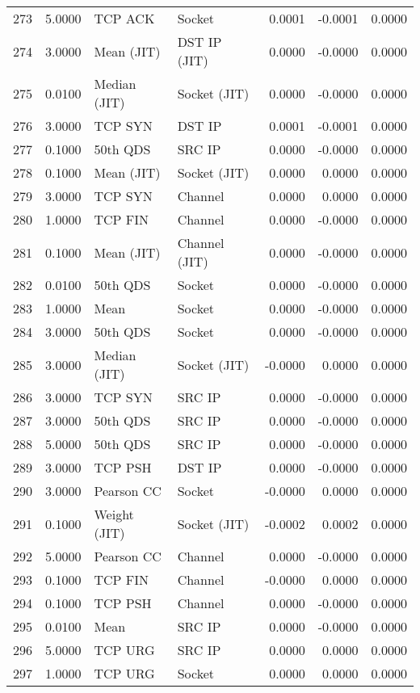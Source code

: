 \begin{longtable}{lrllrrr}
273 & 5.0000 & TCP ACK & Socket & 0.0001 & -0.0001 & 0.0000 \\
274 & 3.0000 & Mean (JIT) & DST IP (JIT) & 0.0000 & -0.0000 & 0.0000 \\
275 & 0.0100 & Median (JIT) & Socket (JIT) & 0.0000 & -0.0000 & 0.0000 \\
276 & 3.0000 & TCP SYN & DST IP & 0.0001 & -0.0001 & 0.0000 \\
277 & 0.1000 & 50th QDS & SRC IP & 0.0000 & -0.0000 & 0.0000 \\
278 & 0.1000 & Mean (JIT) & Socket (JIT) & 0.0000 & 0.0000 & 0.0000 \\
279 & 3.0000 & TCP SYN & Channel & 0.0000 & 0.0000 & 0.0000 \\
280 & 1.0000 & TCP FIN & Channel & 0.0000 & -0.0000 & 0.0000 \\
281 & 0.1000 & Mean (JIT) & Channel (JIT) & 0.0000 & -0.0000 & 0.0000 \\
282 & 0.0100 & 50th QDS & Socket & 0.0000 & -0.0000 & 0.0000 \\
283 & 1.0000 & Mean & Socket & 0.0000 & -0.0000 & 0.0000 \\
284 & 3.0000 & 50th QDS & Socket & 0.0000 & -0.0000 & 0.0000 \\
285 & 3.0000 & Median (JIT) & Socket (JIT) & -0.0000 & 0.0000 & 0.0000 \\
286 & 3.0000 & TCP SYN & SRC IP & 0.0000 & -0.0000 & 0.0000 \\
287 & 3.0000 & 50th QDS & SRC IP & 0.0000 & -0.0000 & 0.0000 \\
288 & 5.0000 & 50th QDS & SRC IP & 0.0000 & -0.0000 & 0.0000 \\
289 & 3.0000 & TCP PSH & DST IP & 0.0000 & -0.0000 & 0.0000 \\
290 & 3.0000 & Pearson CC & Socket & -0.0000 & 0.0000 & 0.0000 \\
291 & 0.1000 & Weight (JIT) & Socket (JIT) & -0.0002 & 0.0002 & 0.0000 \\
292 & 5.0000 & Pearson CC & Channel & 0.0000 & -0.0000 & 0.0000 \\
293 & 0.1000 & TCP FIN & Channel & -0.0000 & 0.0000 & 0.0000 \\
294 & 0.1000 & TCP PSH & Channel & 0.0000 & -0.0000 & 0.0000 \\
295 & 0.0100 & Mean & SRC IP & 0.0000 & -0.0000 & 0.0000 \\
296 & 5.0000 & TCP URG & SRC IP & 0.0000 & 0.0000 & 0.0000 \\
297 & 1.0000 & TCP URG & Socket & 0.0000 & 0.0000 & 0.0000 \\

\end{longtable}
